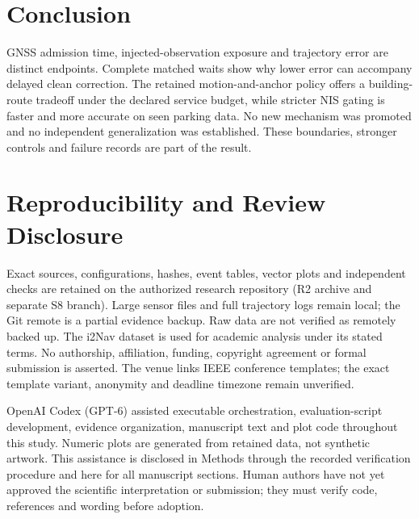 \documentclass[conference]{IEEEtran}
\begin{document}
\section{Conclusion}
GNSS admission time, injected-observation exposure and trajectory error are distinct endpoints. Complete matched waits show why lower error can accompany delayed clean correction. The retained motion-and-anchor policy offers a building-route tradeoff under the declared service budget, while stricter NIS gating is faster and more accurate on seen parking data. No new mechanism was promoted and no independent generalization was established. These boundaries, stronger controls and failure records are part of the result.

\section*{Reproducibility and Review Disclosure}
Exact sources, configurations, hashes, event tables, vector plots and independent checks are retained on the authorized research repository (R2 archive and separate S8 branch). Large sensor files and full trajectory logs remain local; the Git remote is a partial evidence backup. Raw data are not verified as remotely backed up. The i2Nav dataset is used for academic analysis under its stated terms. No authorship, affiliation, funding, copyright agreement or formal submission is asserted. The venue links IEEE conference templates; the exact template variant, anonymity and deadline timezone remain unverified.

OpenAI Codex (GPT-6) assisted executable orchestration, evaluation-script development, evidence organization, manuscript text and plot code throughout this study. Numeric plots are generated from retained data, not synthetic artwork. This assistance is disclosed in Methods through the recorded verification procedure and here for all manuscript sections. Human authors have not yet approved the scientific interpretation or submission; they must verify code, references and wording before adoption.


\end{document}
